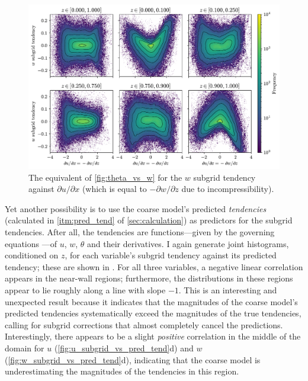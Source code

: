 \documentclass[../main.tex]{subfiles}
\begin{document}
\begin{figure}[ht]
    \centering
    \includegraphics[width=0.9\linewidth]{figures/w_vs_dudx.pdf}
    \caption{
        The equivalent of \cref{fig:theta_vs_w} for the $w$ subgrid
        tendency against $\partial u/\partial x$ (which is equal to
        $-\partial w/\partial z$ due to incompressibility).
    }
    \label{fig:w_vs_dudx}
\end{figure}

\clearpage
Yet another possibility is to use the coarse model's predicted
\emph{tendencies} (calculated in \cref{itm:pred_tend} of
\cref{sec:calculation}) as predictors for the subgrid tendencies. After all,
the tendencies are functions---given by the governing equations
---of $u$, $w$,
$\theta$ and their derivatives. I again generate joint histograms, conditioned
on $z$, for each variable's subgrid tendency against its predicted tendency;
these are shown in
. For all
three variables, a negative linear correlation appears in the near-wall
regions; furthermore, the distributions in these regions appear to lie roughly
along a line with slope $-1$. This is an interesting and unexpected result
because it indicates that the magnitudes of the coarse model's predicted
tendencies systematically exceed the magnitudes of the true tendencies, calling
for subgrid corrections that almost completely cancel the predictions.
Interestingly, there appears to be a slight \emph{positive} correlation in the
middle of the domain for $u$ (\cref{fig:u_subgrid_vs_pred_tend}d) and $w$
(\cref{fig:w_subgrid_vs_pred_tend}d), indicating that the coarse model is
underestimating the magnitudes of the tendencies in this region.
\end{document}
